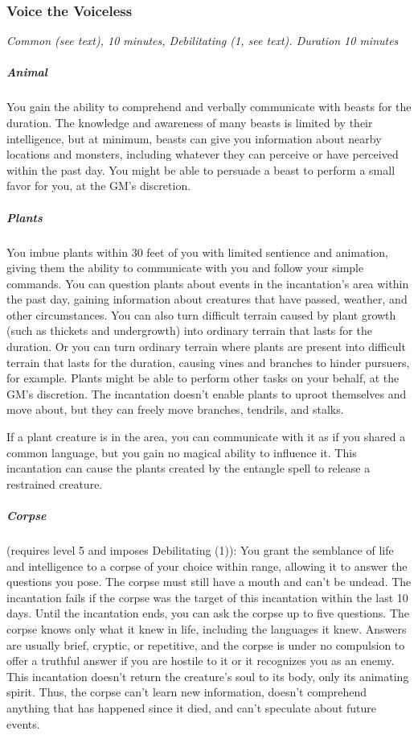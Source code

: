 \subsubsection{Voice the Voiceless}
\textit{Common (see text), 10 minutes, Debilitating (1, see text). Duration 10 minutes}

\subparagraph*{Animal} You gain the ability to comprehend and verbally communicate with beasts for the duration. The knowledge and awareness of many beasts is limited by their intelligence, but at minimum, beasts can give you information about nearby locations and monsters, including whatever they can perceive or have perceived within the past day. You might be able to persuade a beast to perform a small favor for you, at the GM's discretion. 

\subparagraph*{Plants} You imbue plants within 30 feet of you with limited sentience and animation, giving them the ability to communicate with you and follow your simple commands. You can question plants about events in the incantation's area within the past day, gaining information about creatures that have passed, weather, and other circumstances.
You can also turn difficult terrain caused by plant growth (such as thickets and undergrowth) into ordinary terrain that lasts for the duration. Or you can turn ordinary terrain where plants are present into difficult terrain that lasts for the duration, causing vines and branches to hinder pursuers, for example. Plants might be able to perform other tasks on your behalf, at the GM's discretion. The incantation doesn't enable plants to uproot themselves and move about, but they can freely move branches, tendrils, and stalks.

If a plant creature is in the area, you can communicate with it as if you shared a common language, but you gain no magical ability to influence it. This incantation can cause the plants created by the entangle spell to release a restrained creature.

\subparagraph*{Corpse} (requires level 5 and imposes Debilitating (1)): You grant the semblance of life and intelligence to a corpse of your choice within range, allowing it to answer the questions you pose. The corpse must still have a mouth and can't be undead. The incantation fails if the corpse was the target of this incantation within the last 10 days.
Until the incantation ends, you can ask the corpse up to five questions. The corpse knows only what it knew in life, including the languages it knew. Answers are usually brief, cryptic, or repetitive, and the corpse is under no compulsion to offer a truthful answer if you are hostile to it or it recognizes you as an enemy. This incantation doesn't return the creature's soul to its body, only its animating spirit. Thus, the corpse can't learn new information, doesn't comprehend anything that has happened since it died, and can't speculate about future events.

